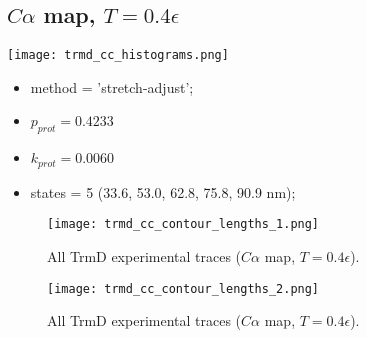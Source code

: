 \subsection{$C\alpha$ map, $T=0.4\epsilon$}
\label{subsec:trmd-cc}
\begin{minipage}[c]{0.7\textwidth}
    \texttt{[image: trmd\_cc\_histograms.png]}
\end{minipage}
\hfill
\begin{minipage}[c]{0.45\textwidth}
    \begin{itemize}
        \item method = 'stretch-adjust';
        \item $p_{prot}=0.4233$
        \item $k_{prot}=0.0060$
        \item states = 5 (33.6, 53.0, 62.8, 75.8, 90.9 nm);
    \end{itemize}
\end{minipage}

\begin{figure}
    \centering
    \texttt{[image: trmd\_cc\_contour\_lengths\_1.png]}
    \caption{All TrmD experimental traces ($C\alpha$ map, $T=0.4\epsilon$).}
    \label{fig:trmd-cc-cl1}
\end{figure}

\begin{figure}
    \centering
    \texttt{[image: trmd\_cc\_contour\_lengths\_2.png]}
    \caption{All TrmD experimental traces ($C\alpha$ map, $T=0.4\epsilon$).}
    \label{fig:trmd-cc-cl2}
\end{figure}

